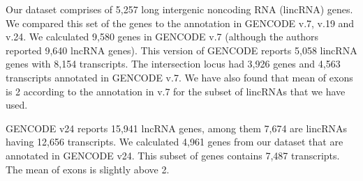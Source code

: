 \documentclass[ncrna,article,submit,moreauthors,pdftex,10pt,a4paper]{mdpi}
\begin{document}
Our dataset comprises of 5,257 long intergenic noncoding RNA (lincRNA) genes. We compared this set of the genes to the annotation in GENCODE v.7\cite{harrow2012}, v.19 and v.24. We calculated 9,580 genes in GENCODE v.7 (although the authors reported 9,640 lncRNA genes).  This version of GENCODE reports 5,058 lincRNA genes with 8,154 transcripts. The intersection locus had 3,926 genes and 4,563 transcripts annotated in GENCODE v.7. We have also found that mean of exons is 2 according to the annotation in v.7 for the subset of lincRNAs that we have used.

GENCODE v24 reports 15,941 lncRNA genes, among them 7,674 are lincRNAs having 12,656 transcripts. We calculated 4,961 genes from our dataset that are annotated in GENCODE v24. This subset of genes contains 7,487 transcripts. The mean of exons is slightly above 2.



\end{document}
